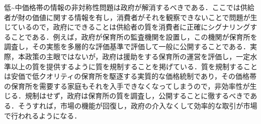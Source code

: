 \documentclass[
]{ltjarticle}
\begin{document}
\hspace*{0.333em}\hspace*{0.333em}\hspace*{0.333em}\hspace*{0.333em}低\textasciitilde 中価格帯の情報の非対称性問題は政府が解消するべきである．ここでは供給者が財の価値に関する情報を有し，消費者がそれを観察できないことで問題が生じているので，政府にできることは供給者の質を消費者に正確にシグナリングすることである．例えば，政府が保育所の監査機関を設置し，この機関が保育所を調査し，その実態を多層的な評価基準で評価して一般に公開することである．実際，本政策の主眼ではないが，政府は援助をする保育所の運営を評価し，一定水準以上の質を提供するように質を規制することを掲げている．質を規制することは安価で低クオリティの保育所を駆逐する実質的な価格統制であり，その価格帯の保育所を需要する家庭もそれを入手できなくなってしまうので，非効率性が生じる．規制はせず，政府は保育所の質を調査し，公開することに徹するべきである．そうすれば，市場の機能が回復し，政府の介入なくして効率的な取引が市場で行われるようになる．\\
\end{document}
